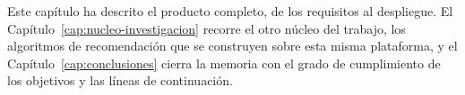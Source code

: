 Este capítulo ha descrito el producto completo, de los requisitos al despliegue. El
Capítulo~\ref{cap:nucleo-investigacion} recorre el otro núcleo del trabajo, los algoritmos de
recomendación que se construyen sobre esta misma plataforma, y el Capítulo~\ref{cap:conclusiones}
cierra la memoria con el grado de cumplimiento de los objetivos y las líneas de continuación.
